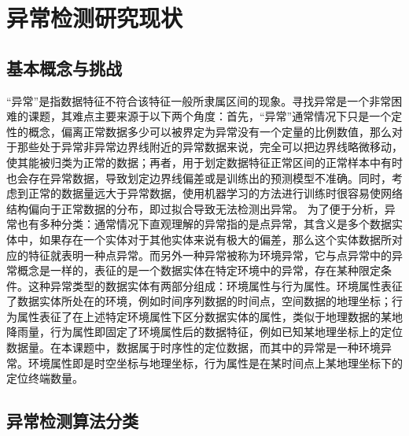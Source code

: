 \documentclass[a4paper,AutoFakeBold,oneside,12pt]{book}
\begin{document}
\section{异常检测研究现状}

\subsection{基本概念与挑战}

“异常”是指数据特征不符合该特征一般所隶属区间的现象。寻找异常是一个非常困难的课题，其难点主要来源于以下两个角度：首先，“异常”通常情况下只是一个定性的概念，偏离正常数据多少可以被界定为异常没有一个定量的比例数值，那么对于那些处于异常非异常边界线附近的异常数据来说，完全可以把边界线略微移动，使其能被归类为正常的数据；再者，用于划定数据特征正常区间的正常样本中有时也会存在异常数据，导致划定边界线偏差或是训练出的预测模型不准确。同时，考虑到正常的数据量远大于异常数据，使用机器学习的方法进行训练时很容易使网络结构偏向于正常数据的分布，即过拟合导致无法检测出异常。
为了便于分析，异常也有多种分类：通常情况下直观理解的异常指的是点异常，其含义是多个数据实体中，如果存在一个实体对于其他实体来说有极大的偏差，那么这个实体数据所对应的特征就表明一种点异常。而另外一种异常被称为环境异常，它与点异常中的异常概念是一样的，表征的是一个数据实体在特定环境中的异常，存在某种限定条件。这种异常类型的数据实体有两部分组成：环境属性与行为属性。环境属性表征了数据实体所处在的环境，例如时间序列数据的时间点，空间数据的地理坐标；行为属性表征了在上述特定环境属性下区分数据实体的属性，类似于地理数据的某地降雨量，行为属性即固定了环境属性后的数据特征，例如已知某地理坐标上的定位数据量。在本课题中，数据属于时序性的定位数据，而其中的异常是一种环境异常。环境属性即是时空坐标与地理坐标，行为属性是在某时间点上某地理坐标下的定位终端数量。

\subsection{异常检测算法分类}
\end{document}
